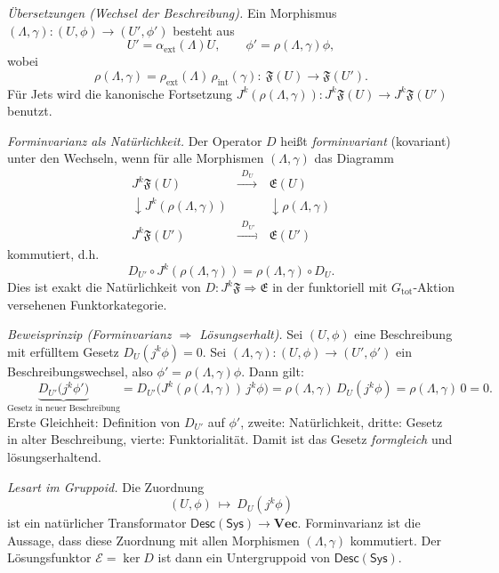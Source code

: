 \documentclass[10pt, letterpaper]{article}
\begin{document}
\emph{Übersetzungen (Wechsel der Beschreibung).}
Ein Morphismus $(\Lambda,\gamma):(U,\phi)\to(U',\phi')$ besteht aus
\[
U'=\alpha_{\mathrm{ext}}(\Lambda)U,\qquad
\phi'=\rho(\Lambda,\gamma)\phi,
\]
wobei
\[
\rho(\Lambda,\gamma)=\rho_{\mathrm{ext}}(\Lambda)\,\rho_{\mathrm{int}}(\gamma):\ \mathfrak F(U)\to \mathfrak F(U').
\]
Für Jets wird die kanonische Fortsetzung $J^k(\rho(\Lambda,\gamma)):J^k\mathfrak F(U)\to J^k\mathfrak F(U')$ benutzt.

\emph{Forminvarianz als Natürlichkeit.}
Der Operator $D$ heißt \emph{forminvariant} (kovariant) unter den Wechseln, wenn
für alle Morphismen $(\Lambda,\gamma)$ das Diagramm
\[
\begin{array}{ccc}
J^k\mathfrak F(U) & \xrightarrow{\ \ D_U\ \ } & \mathfrak E(U)\\[0.4em]
\downarrow J^k(\rho(\Lambda,\gamma)) & & \downarrow \rho(\Lambda,\gamma)\\[0.4em]
J^k\mathfrak F(U') & \xrightarrow{\ \ D_{U'}\ \ } & \mathfrak E(U')
\end{array}
\]
kommutiert, d.h.
\[
D_{U'}\circ J^k(\rho(\Lambda,\gamma))=\rho(\Lambda,\gamma)\circ D_U.
\]
Dies ist exakt die Natürlichkeit von $D:J^k\mathfrak F\Rightarrow \mathfrak E$
in der funktoriell mit $G_{\mathrm{tot}}$-Aktion versehenen Funktorkategorie.

\emph{Beweisprinzip (Forminvarianz $\Rightarrow$ Lösungserhalt).}
Sei $(U,\phi)$ eine Beschreibung mit erfülltem Gesetz $D_U(j^k\phi)=0$.
Sei $(\Lambda,\gamma):(U,\phi)\to(U',\phi')$ ein Beschreibungswechsel, also $\phi'=\rho(\Lambda,\gamma)\phi$.
Dann gilt:
\[
\underbrace{D_{U'}\big(j^k\phi'\big)}_{\text{Gesetz in neuer Beschreibung}}
= D_{U'}\big(J^k(\rho(\Lambda,\gamma))\,j^k\phi\big)
= \rho(\Lambda,\gamma)\,D_U(j^k\phi)
= \rho(\Lambda,\gamma)\,0
= 0.
\]
Erste Gleichheit: Definition von $D_{U'}$ auf $\phi'$,
zweite: Natürlichkeit,
dritte: Gesetz in alter Beschreibung,
vierte: Funktorialität. Damit ist das Gesetz \emph{formgleich} und lösungserhaltend.

\emph{Lesart im Gruppoid.}
Die Zuordnung
\[
(U,\phi)\ \mapsto\ D_U(j^k\phi)
\]
ist ein natürlicher Transformator $\mathsf{Desc}(\mathsf{Sys})\to \mathbf{Vec}$.
Forminvarianz ist die Aussage, dass diese Zuordnung mit allen Morphismen
$(\Lambda,\gamma)$ kommutiert. Der Lösungsfunktor $\mathcal E=\ker D$ ist dann
ein Untergruppoid von $\mathsf{Desc}(\mathsf{Sys})$.
\end{document}
